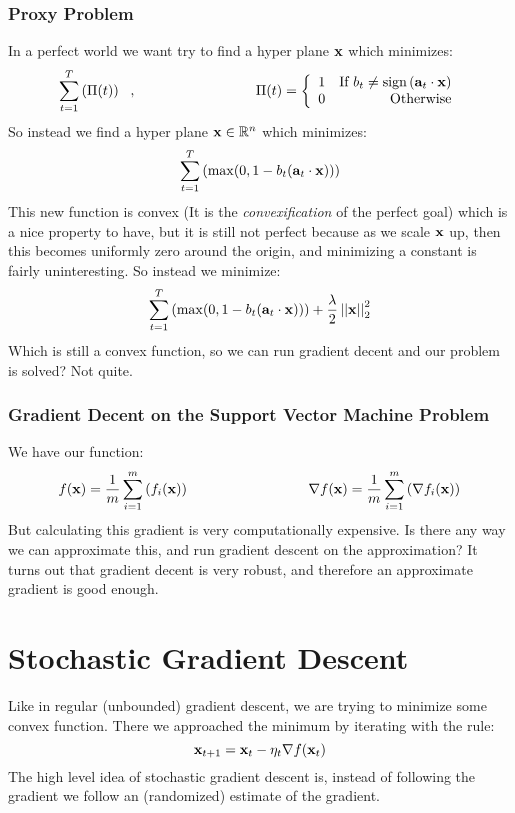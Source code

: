 \documentclass[11pt]{article}
\newcommand{\ltnorm} [1] {
  \left| \left| #1 \right| \right|_{2}
}
\begin{document}
\subsubsection{Proxy Problem}
In a perfect world we want try to find a hyper plane ${\bf x}$ which minimizes:
\[ \sum_{t = 1}^{T} \left( \Pi (t) \right) \,\,\,\,,\hspace*{3cm} \Pi (t) = \left\lbrace \begin{array}{rr} 1 & \text{If } b_{t} \neq \text{sign} \left( {\bf a}_{t} \cdot {\bf x} \right) \\ 0 & \text{Otherwise} \end{array} \right. \]
So instead we find a hyper plane ${\bf x} \in \mathbb{R}^{n}$ which minimizes:
\[ \sum_{t = 1}^{T} \left( \max (0, 1 - b_{t} ({\bf a}_{t} \cdot {\bf x})) \right) \]
This new function is convex (It is the \emph{convexification} of the perfect goal) which is a nice property to have, but it is still not perfect because as we scale ${\bf x}$ up, then this becomes uniformly zero around the origin, and minimizing a constant is fairly uninteresting.  So instead we minimize:
\[ \sum_{t = 1}^{T} \left( \max (0, 1 - b_{t} ({\bf a}_{t} \cdot {\bf x})) \right) + \frac{\lambda}{2} \ltnorm{\bf x}^{2} \]
Which is still a convex function, so we can run gradient decent and our problem is solved?  Not quite.

\subsubsection{Gradient Decent on the Support Vector Machine Problem}
We have our function:
\[ f({\bf x}) = \frac{1}{m} \sum_{i = 1}^{m} \left( f_{i} ({\bf x}) \right) \hspace*{3cm} \nabla f({\bf x}) = \frac{1}{m} \sum_{i = 1}^{m} \left( \nabla f_{i} ({\bf x}) \right) \]
But calculating this gradient is very computationally expensive.  Is there any way we can approximate this, and run gradient descent on the approximation?  It turns out that gradient decent is very robust, and therefore an approximate gradient is good enough.


\section{Stochastic Gradient Descent}
Like in regular (unbounded) gradient descent, we are trying to minimize some convex function.  There we approached the minimum by iterating with the rule:
\begin{equation}
{\bf x}_{t + 1} = {\bf x}_{t} - \eta_{t} \nabla f({\bf x}_{t})
\end{equation}
The high level idea of stochastic gradient descent is, instead of following the gradient we follow an (randomized) estimate of the gradient.
\end{document}
